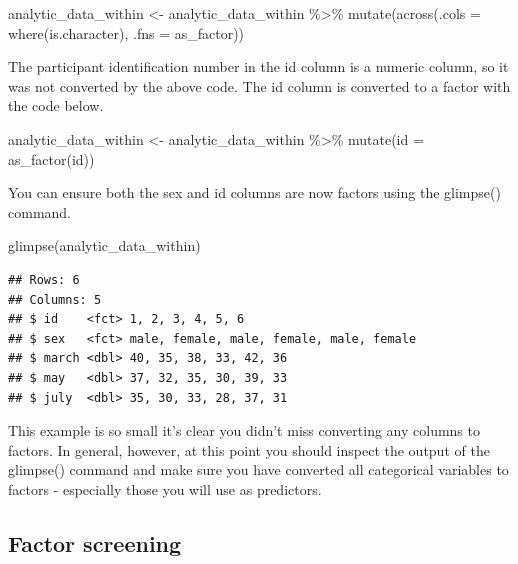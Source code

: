 \documentclass[
]{krantz}
\makeatletter
\newenvironment{Shaded}{\begin{snugshade}}{\end{snugshade}}
\newcommand{\AttributeTok}[1]{\textcolor[rgb]{0.61,0.61,0.61}{#1}}
\newcommand{\FunctionTok}[1]{\textcolor[rgb]{0,0,0}{#1}}
\newcommand{\NormalTok}[1]{#1}
\newcommand{\OtherTok}[1]{\textcolor[rgb]{0.37,0.37,0.37}{#1}}
\newcommand{\SpecialCharTok}[1]{\textcolor[rgb]{0,0,0}{#1}}
\newenvironment{kframe}{%
\medskip{}
\setlength{\fboxsep}{.8em}
 \def\at@end@of@kframe{}%
 \ifinner\ifhmode%
  \def\at@end@of@kframe{\end{minipage}}%
  \begin{minipage}{\columnwidth}%
 \fi\fi%
 \def\FrameCommand##1{\hskip\@totalleftmargin \hskip-\fboxsep
 \colorbox{shadecolor}{##1}\hskip-\fboxsep
     \hskip-\linewidth \hskip-\@totalleftmargin \hskip\columnwidth}%
 \MakeFramed {\advance\hsize-\width
   \@totalleftmargin\z@ \linewidth\hsize
   \@setminipage}}%
 {\par\unskip\endMakeFramed%
 \at@end@of@kframe}
\renewenvironment{Shaded}{\begin{kframe}}{\end{kframe}}
\makeatother
\begin{document}
\begin{Shaded}
\begin{Highlighting}[]
\NormalTok{analytic\_data\_within }\OtherTok{\textless{}{-}}\NormalTok{ analytic\_data\_within }\SpecialCharTok{\%\textgreater{}\%}
  \FunctionTok{mutate}\NormalTok{(}\FunctionTok{across}\NormalTok{(}\AttributeTok{.cols =} \FunctionTok{where}\NormalTok{(is.character),}
                \AttributeTok{.fns =}\NormalTok{ as\_factor))}
\end{Highlighting}
\end{Shaded}

The participant identification number in the id column is a numeric column, so it was not converted by the above code. The id column is converted to a factor with the code below.

\begin{Shaded}
\begin{Highlighting}[]
\NormalTok{analytic\_data\_within }\OtherTok{\textless{}{-}}\NormalTok{ analytic\_data\_within }\SpecialCharTok{\%\textgreater{}\%}
  \FunctionTok{mutate}\NormalTok{(}\AttributeTok{id =} \FunctionTok{as\_factor}\NormalTok{(id))}
\end{Highlighting}
\end{Shaded}

You can ensure both the sex and id columns are now factors using the glimpse() command.

\begin{Shaded}
\begin{Highlighting}[]
\FunctionTok{glimpse}\NormalTok{(analytic\_data\_within)}
\end{Highlighting}
\end{Shaded}

\begin{verbatim}
## Rows: 6
## Columns: 5
## $ id    <fct> 1, 2, 3, 4, 5, 6
## $ sex   <fct> male, female, male, female, male, female
## $ march <dbl> 40, 35, 38, 33, 42, 36
## $ may   <dbl> 37, 32, 35, 30, 39, 33
## $ july  <dbl> 35, 30, 33, 28, 37, 31
\end{verbatim}

This example is so small it's clear you didn't miss converting any columns to factors. In general, however, at this point you should inspect the output of the glimpse() command and make sure you have converted all categorical variables to factors - especially those you will use as predictors.

\hypertarget{factor-screening-3}{%
\subsection{Factor screening}\label{factor-screening-3}}
\end{document}
